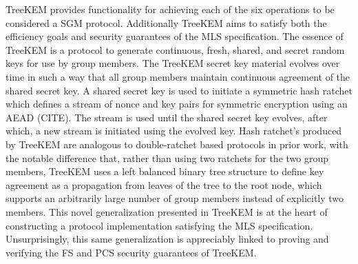 TreeKEM provides functionality for achieving each of the six operations to be considered a SGM protocol.
Additionally TreeKEM aims to satisfy both the efficiency goals and security guarantees of the MLS specification.
The essence of TreeKEM is a protocol to generate continuous, fresh, shared, and secret random keys for use by group members.
The TreeKEM secret key material evolves over time in such a way that all group members maintain continuous agreement of the shared secret key.
A shared secret key is used to initiate a symmetric hash ratchet which defines a stream of nonce and key pairs for symmetric encryption using an AEAD (CITE).
The stream is used until the shared secret key evolves, after which, a new stream is initiated using the evolved key.
Hash ratchet's produced by TreeKEM are analogous to double-ratchet based protocols in prior work, with the notable difference that, rather than using two ratchets for the two group members, TreeKEM uses a left balanced binary tree structure to define key agreement as a propagation from leaves of the tree to the root node, which supports an arbitrarily large number of group members instead of explicitly two members.
This novel generalization presented in TreeKEM is at the heart of constructing a protocol implementation satisfying the MLS specification.
Unsurprisingly, this same generalization is appreciably linked to proving and verifying the FS and PCS security guarantees of TreeKEM.

